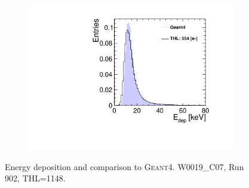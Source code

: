 \begin{figure}[htbp]
\begin{subfigure}[b]{0.32\textwidth}
    \includegraphics[width=\textwidth]{./figures/Calibration/Edep_G4_W0019_C07.pdf}
    \caption{}
  \end{subfigure}
  \caption{Energy deposition and comparison to
    \textsc{Geant4}. W0019\_C07, Run 902, THL=1148.}
  \label{fig:EdepW19C7}
\end{figure}


